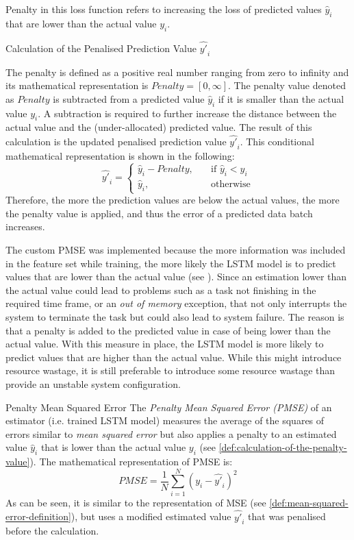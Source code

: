   Penalty in this loss function refers to increasing the loss of predicted values $\hat{y}_i$ that are lower than the actual value $y_i$.

  \begin{pabox}{Calculation of the Penalised Prediction Value $\hat{y'}_i$}
  \label{def:calculation-of-the-penalty-value}

    The penalty is defined as a positive real number ranging from zero to infinity and its mathematical representation is $Penalty = [0, \infty]$.
    The penalty value denoted as $Penalty$ is subtracted from a predicted value $\hat{y}_i$ if it is smaller than the actual value $y_i$. A subtraction is required to further increase the distance between the actual value and the (under-allocated) predicted value.
    The result of this calculation is the updated penalised prediction value $\hat{y'}_i$.
    This conditional mathematical representation is shown in the following:
    $$\hat{y'}_i = 
    \begin{cases}
      \hat{y}_i - Penalty, & \quad \textrm{if } \hat{y}_i < y_i \\
      \hat{y}_i,  & \quad \textrm{otherwise}
    \end{cases}$$
    Therefore, the more the prediction values are below the actual values, the more the penalty value is applied, and thus the error of a predicted data batch increases.

  \end{pabox}

  The custom PMSE was implemented because the more information was included in the feature set while training, the more likely the LSTM model is to predict values that are lower than the actual value (see ). Since an estimation lower than the actual value could lead to problems such as a task not finishing in the required time frame, or an \emph{out of memory} exception, that not only interrupts the system to terminate the task but could also lead to system failure. The reason is that a penalty is added to the predicted value in case of being lower than the actual value. With this measure in place, the LSTM model is more likely to predict values that are higher than the actual value. While this might introduce resource wastage, it is still preferable to introduce some resource wastage than provide an unstable system configuration.

  \begin{pabox}{Penalty Mean Squared Error}
    \label{def:penalty-mean-squared-error-definition}
    The \emph{Penalty Mean Squared Error (PMSE)} of an estimator (i.e. trained LSTM model) measures the average of the squares of errors similar to \emph{mean squared error} but also applies a penalty to an estimated value $\hat{y}_i$ that is lower than the actual value $y_i$ (see \ref{def:calculation-of-the-penalty-value}). 
    The mathematical representation of PMSE is:
    $$PMSE = \frac{1}{N} \sum_{i = 1}^{N}\left(y_i - \hat{y'}_i\right)^2$$
    As can be seen, it is similar to the representation of MSE (see \ref{def:mean-squared-error-definition}), but uses a modified estimated value $\hat{y'}_i$ that was penalised before the calculation.
  \end{pabox}

